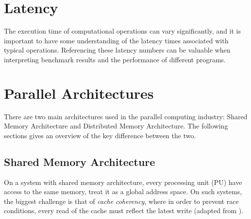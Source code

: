 

\section{Latency}
The execution time of computational operations can vary significantly, and it is important to have some understanding of the latency times associated with typical operations. Referencing these latency numbers can be valuable when interpreting benchmark results and the performance of different programs.


\section{Parallel Architectures}
There are two main architectures used in the parallel computing industry: Shared Memory Architecture and Distributed Memory Architecture. The following sections gives an overview of the key difference between the two.

\subsection{Shared Memory Architecture}
On a system with shared memory architecture, every processing unit (PU) have access to the same memory, treat it as a global address space. On such systems, the biggest challenge is that of \textit{cache coherency}, where in order to prevent race conditions, every read of the cache must reflect the latest write (adapted from \cite{manchanda2010non}). 

